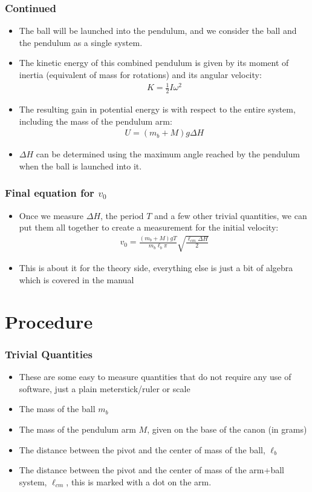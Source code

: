 \documentclass[aspectratio=169]{beamer}
\begin{document}
\begin{frame}
  \frametitle{Continued}
  \begin{itemize}
  \item The ball will be launched into the pendulum, and we consider the ball and the pendulum as a single system.
  \item The kinetic energy of this combined pendulum is given by its moment of inertia (equivalent of mass for rotations) and its angular velocity:
    \begin{align*}
      K=\frac12I\omega^2
    \end{align*}
  \item The resulting gain in potential energy is with respect to the entire system, including the mass of the pendulum arm:
    \begin{align*}
      U=(m_b+M)g\Delta H
    \end{align*}
  \item $\Delta H$ can be determined using the maximum angle reached by the pendulum when the ball is launched into it.
  \end{itemize}
\end{frame}

\begin{frame}
  \frametitle{Final equation for $v_0$}
  \begin{itemize}
  \item Once we measure $\Delta H$, the period $T$ and a few other trivial quantities, we can put them all together to create a measurement for the initial velocity:
    \begin{align*}
      v_0=\frac{(m_b+M)gT}{m_b\ell_b\pi}\sqrt{\frac{\ell_{cm}\Delta H}{2}}
    \end{align*}
  \item This is about it for the theory side, everything else is just a bit of algebra which is covered in the manual
  \end{itemize}
\end{frame}

\section{Procedure}
\begin{frame}
  \frametitle{Trivial Quantities}
  \begin{itemize}
  \item These are some easy to measure quantities that do not require any use of software, just a plain meterstick/ruler or scale
  \item The mass of the ball $m_b$
  \item The mass of the pendulum arm $M$, given on the base of the canon (in grams)
  \item The distance between the pivot and the center of mass of the ball, $\ell_b$
  \item The distance between the pivot and the center of mass of the arm+ball system, $\ell_{cm}$, this is marked with a dot on the arm.
  \end{itemize}
\end{frame}
\end{document}
